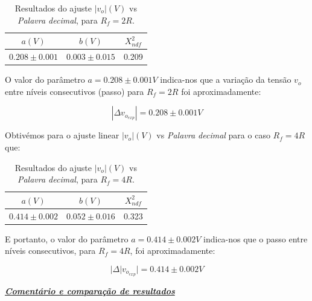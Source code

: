\documentclass[a4paper,11pt]{report}
\begin{document}
\begin{table}[h]
\begin{center}
\begin{tabular}{ || c | c | c || }
\hline
$a(V)$ & $b(V)$ &  $X^2_{ndf}$\\ \hline \hline
$0.208 \pm 0.001$ & $0.003 \pm 0.015$ &0.209\\ \hline

\end{tabular}

\caption{Resultados do ajuste $|v_o| (V)$ vs \textit{Palavra decimal}, para $R_f=2R$.\label{tab:res2Rpasso}}
\end{center}
\end{table}

O valor do parâmetro $a=0.208 \pm 0.001 V$ indica-nos que a variação da tensão $v_o$ entre níveis consecutivos (passo) para $R_f=2R$ foi aproximadamente:

\begin{equation}\label{eq:v02Rexp}
\boxed{|\Delta v_{o_{exp}}|=0.208 \pm 0.001V}
\end{equation}


Obtivémos para o ajuste linear $|v_o| (V)$ vs \textit{Palavra decimal} para o caso $R_f=4R$ que:

\begin{table}[h]
\begin{center}
\begin{tabular}{ || c | c | c || }
\hline
$a(V)$ & $b(V)$ &  $X^2_{ndf}$\\ \hline \hline
$0.414 \pm 0.002$ & $0.052 \pm 0.016$ &0.323\\ \hline

\end{tabular}

\caption{Resultados do ajuste $|v_o| (V)$ vs \textit{Palavra decimal}, para $R_f=4R$.\label{tab:res4Rpasso}}
\end{center}
\end{table}


E portanto, o valor do parâmetro $a=0.414 \pm 0.002 V$ indica-nos que o passo entre níveis consecutivos, para $R_f=4R$, foi aproximadamente:

\begin{equation}\label{eq:v04Rexp}
\boxed{|\Delta |v_{o_{exp}}|=0.414 \pm 0.002V}
\end{equation}

\vspace{15pt}
\large\underline{{\textit{\textbf{Comentário e comparação de resultados}}}}\\
\par
\end{document}
